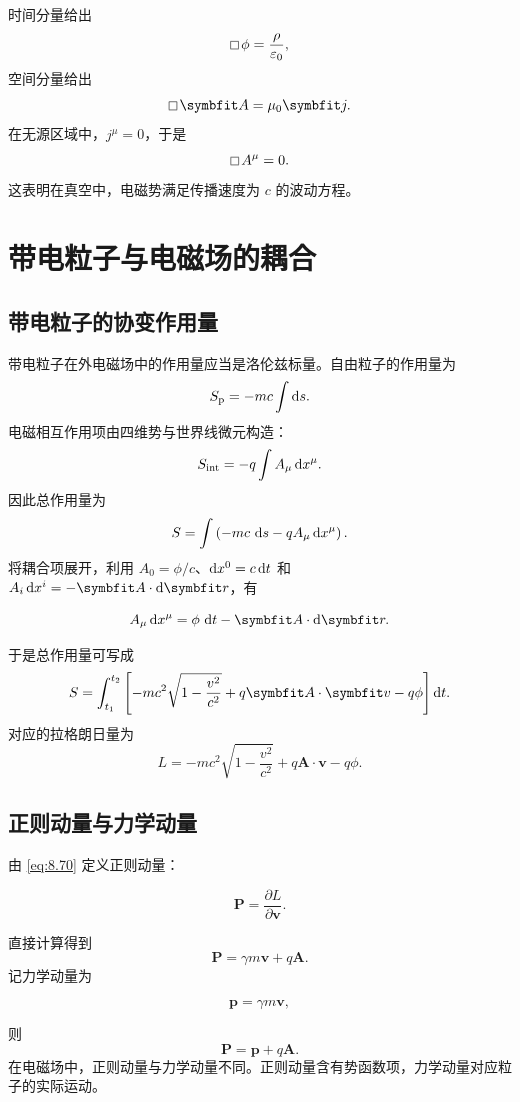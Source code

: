 时间分量给出
\[
\dalembert\phi=\frac{\rho}{\varepsilon_{0}},
\]
空间分量给出
\[
\dalembert\bm{A}=\mu_{0}\bm{j}.
\]
在无源区域中，$j^{\mu}=0$，于是
\[
\dalembert A^{\mu}=0.
\]
这表明在真空中，电磁势满足传播速度为 $c$ 的波动方程。

\section{带电粒子与电磁场的耦合}

\subsection{带电粒子的协变作用量}

带电粒子在外电磁场中的作用量应当是洛伦兹标量。自由粒子的作用量为
\[
S_{\mathrm{p}}
=
-mc\int \mathop{}\!\mathrm{d} s.
\]
电磁相互作用项由四维势与世界线微元构造：
\[
S_{\mathrm{int}}
=
-q\int A_{\mu}\mathop{}\!\mathrm{d} x^{\mu}.
\]
因此总作用量为
\begin{equation}
	S
	=
	\int
	\left(
	-mc\,\mathop{}\!\mathrm{d} s
	-
	qA_{\mu}\mathop{}\!\mathrm{d} x^{\mu}
	\right).
	\label{eq:8.67}
\end{equation}
将耦合项展开，利用 $A_{0}=\phi/c$、$\mathop{}\!\mathrm{d} x^{0}=c\mathop{}\!\mathrm{d} t$ 和 $A_{i}\dif x^{i}=-\bm{A}\cdot\dif\bm{r}$，有

\[
A_{\mu}\dif x^{\mu}
=
\phi\,\dif t
-
\bm{A}\cdot\dif\bm{r}.
\]

于是总作用量可写成
\[
S
=
\int_{t_{1}}^{t_{2}}
\left[
-mc^{2}\sqrt{1-\frac{v^{2}}{c^{2}}}
+
q\bm{A}\cdot\bm{v}
-
q\phi
\right]\dif t.
\]
对应的拉格朗日量为
\begin{equation}
	L
	=
	-mc^{2}\sqrt{1-\frac{v^{2}}{c^{2}}}
	+
	q\bm{A}\cdot\bm{v}
	-
	q\phi.
	\label{eq:8.70}
\end{equation}

\subsection{正则动量与力学动量}

由 \eqref{eq:8.70} 定义正则动量：

\[
\bm{P}
=
\frac{\partial L}{\partial\bm{v}}.
\]

直接计算得到
\begin{equation}
	\bm{P}
	=
	\gamma m\bm{v}+q\bm{A}.
	\label{eq:8.72}
\end{equation}
记力学动量为

\[
\bm{p}=\gamma m\bm{v},
\]

则
\begin{equation}
	\bm{P}=\bm{p}+q\bm{A}.
	\label{eq:8.74}
\end{equation}
在电磁场中，正则动量与力学动量不同。正则动量含有势函数项，力学动量对应粒子的实际运动。

